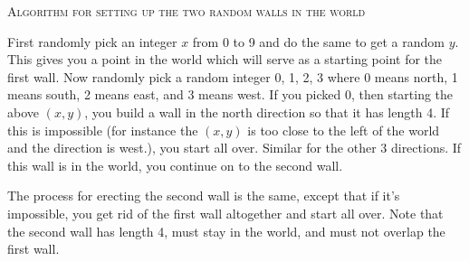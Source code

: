 \textsc{Algorithm for setting up the two random walls in the world}


First randomly pick an integer $x$ from 0 to 9 and do the same
to get a random $y$.
This gives you a point in the world which will serve
as a starting point for the
first wall.
Now randomly pick a random integer 0, 1, 2, 3
where 0 means north, 1 means south, 2 means east, and 3 means west.
If you picked 0, then starting the above $(x,y)$, you build a wall
in the north direction so that it has length 4.
If this is impossible (for instance the $(x,y)$ is too close to the
left of the world and the direction is west.), you start all over.
Similar for the other 3 directions.
If this wall is in the world, you continue on to the second wall.

The process for erecting the second wall is the same,
except that if it's impossible, you get rid of the first wall altogether
and start all over.
Note that the second wall has length 4, must stay in the world,
and must not overlap the first wall.


